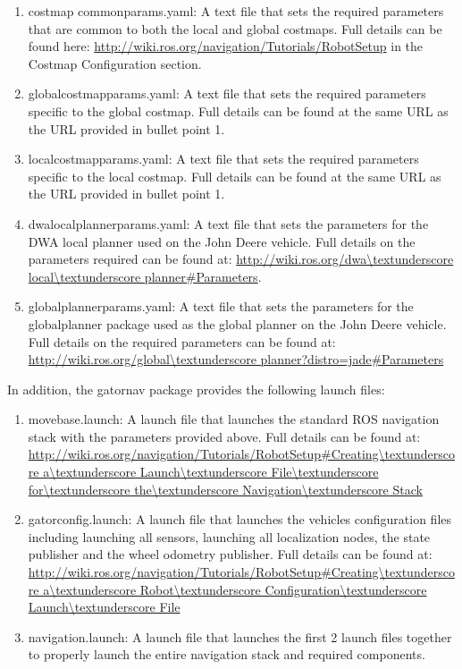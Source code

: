 \begin{enumerate}
\item costmap \textunderscore common\textunderscore params.yaml: A text file that sets the required parameters that are common to both the local and global costmaps. Full details can be found here: \url{http://wiki.ros.org/navigation/Tutorials/RobotSetup}  in the Costmap Configuration section.
\item global\textunderscore costmap\textunderscore params.yaml: A text file that sets the required parameters specific to the global costmap. Full details can be found at the same URL as the URL provided in bullet point 1.
\item local\textunderscore costmap\textunderscore params.yaml: A text file that sets the required parameters specific to the local costmap. Full details can be found at the same URL as the URL provided in bullet point 1.
\item dwa\textunderscore local\textunderscore planner\textunderscore params.yaml: A text file that sets the parameters for the DWA local planner used on the John Deere vehicle. Full details on the parameters required can be found at: \url{http://wiki.ros.org/dwa\textunderscore local\textunderscore planner#Parameters}.
\item global\textunderscore planner\textunderscore params.yaml: A text file that sets the parameters for the global\textunderscore planner package used as the global planner on the John Deere vehicle. Full details on the required parameters can be found at: \url{http://wiki.ros.org/global\textunderscore planner?distro=jade#Parameters}
\end{enumerate}

In addition, the gator\textunderscore nav package provides the following launch files:

\begin{enumerate}
\item move\textunderscore base.launch: A launch file that launches the standard ROS navigation stack with the parameters provided above. Full details can be found at: \url{http://wiki.ros.org/navigation/Tutorials/RobotSetup#Creating\textunderscore a\textunderscore Launch\textunderscore File\textunderscore for\textunderscore the\textunderscore Navigation\textunderscore Stack}
\item gator\textunderscore config.launch: A launch file that launches the vehicles configuration files including launching all sensors, launching all localization nodes, the state publisher and the wheel odometry publisher. Full details can be found at: \url{http://wiki.ros.org/navigation/Tutorials/RobotSetup#Creating\textunderscore a\textunderscore Robot\textunderscore Configuration\textunderscore Launch\textunderscore File}
\item navigation.launch: A launch file that launches the first 2 launch files together to properly launch the entire navigation stack and required components.
\end{enumerate}

